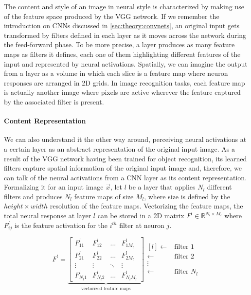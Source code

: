 The content and style of an image in neural style is characterized by making use of the feature space produced by the VGG network.
If we remember the introduction on CNNs discussed in \autoref{sec:theory:convnets}, an original input gets transformed by filters defined in each layer as it moves across the network during the feed-forward phase.
To be more precise, a layer produces as many feature maps as filters it defines, each one of them highlighting different features of the input and represented by neural activations.
Spatially, we can imagine the output from a layer as a volume in which each slice is a feature map where neuron responses are arranged in 2D grids.
In image recognition tasks, each feature map is actually another image where pixels are active wherever the feature captured by the associated filter is present.

\paragraph{Content Representation}
We can also understand it the other way around, perceiving neural activations at a certain layer as an abstract representation of the original input image.
As a result of the VGG network having been trained for object recognition, its learned filters capture spatial information of the original input image and, therefore, we can talk of the neural activations from a CNN layer as its content representation.
Formalizing it for an input image $\vec{x}$, let $l$ be a layer that applies $N_l$ different filters and produces $N_l$ feature maps of size $M_l$, where size is defined by the ${height}\times{width}$ resolution of the feature maps.
Vectorizing the feature maps, the total neural response at layer $l$ can be stored in a 2D matrix $F^l \in \mathbb{R}^{{N_l}\times{M_l}}$ where $F^l_{ij}$ is the feature activation for the $i^{th}$ filter at neuron $j$.

\begin{equation}
  F^l =
  \underbrace{
    \begin{bmatrix}
      F^l_{11}   & F^l_{12}   & \dots  & F^l_{1M_l} \\
      F^l_{21}   & F^l_{22}   & \dots  & F^l_{2M_l} \\
      \vdots     & \vdots     & \ddots & \vdots   \\
      F^l_{N_l1} & F^l_{N_l2} & \dots  & F^l_{N_lM_l}
    \end{bmatrix}
  }_{\text{vectorized feature maps}}
  \begin{matrix*}[l]
    \leftarrow & \text{filter } 1 \\
    \leftarrow & \text{filter } 2 \\
    \vdots                     \\
    \leftarrow & \text{filter } N_l
  \end{matrix*}
\end{equation}

